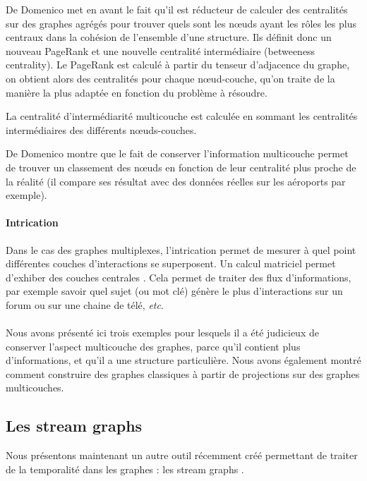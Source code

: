 \documentclass[11pt,a4paper]{article}
\theoremstyle{definition}
\theoremstyle{remark}
\theoremstyle{remark}
\def \stgs {stream graphs}
\begin{document}
De Domenico \cite{centraliteMulti} met en avant le fait qu'il est \og réducteur \fg{} de calculer des centralités sur des graphes agrégés pour trouver quels sont les n\oe{}uds ayant les rôles les plus centraux dans la cohésion de l'ensemble d'une structure. Ils définit donc un nouveau \og PageRank \fg{} et une nouvelle centralité intermédiaire (betweeness centrality). Le PageRank est calculé à partir du tenseur d'adjacence du graphe, on obtient alors des centralités pour chaque n\oe{}ud-couche, qu'on traite de la manière la plus adaptée en fonction du problème à résoudre.

La centralité d'intermédiarité multicouche est calculée en sommant les centralités intermédiaires des différents nœuds-couches.

De Domenico montre que le fait de conserver l'information multicouche permet de trouver un classement des n\oe{}uds en fonction de leur centralité plus proche de la réalité (il compare ses résultat avec des données réelles sur les aéroports par exemple).

\paragraph{Intrication}

Dans le cas des graphes multiplexes, l'intrication\cite{intrication} permet de mesurer à quel point différentes couches d'interactions se superposent. Un calcul matriciel permet d'exhiber des couches \og centrales \fg{}. Cela permet de traiter des flux d'informations, par exemple savoir quel sujet (ou mot clé) génère le plus d'interactions sur un forum ou sur une chaine de télé, \textit{etc}.

\paragraph{}

Nous avons présenté ici trois exemples pour lesquels il a été judicieux de conserver l'aspect multicouche des graphes, parce qu'il contient plus d'informations, et qu'il a une structure particulière. Nous avons également montré comment construire des graphes \og classiques \fg{} à partir de projections sur des graphes multicouches.


\subsection{Les \stgs }

Nous présentons maintenant un autre outil récemment créé permettant de traiter de la temporalité dans les graphes : les \stgs{} \cite{stream}.
\end{document}
